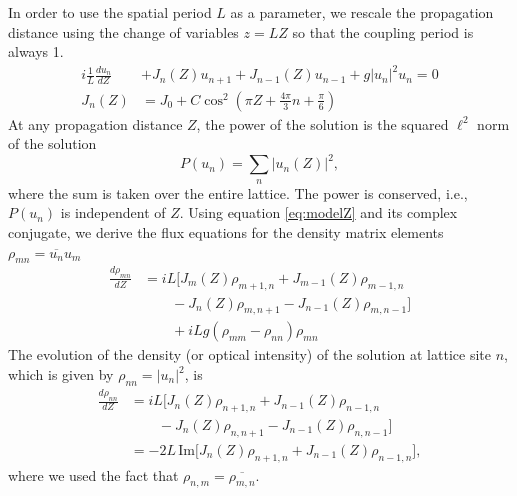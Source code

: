 \documentclass[reprint, amsmath,amssymb,aps,pre]{revtex4-2}
\begin{document}
In order to use the spatial period $L$ as a parameter, we rescale the propagation distance using the change of variables $z = L Z$ so that the coupling period is always 1.
\begin{equation}\label{eq:modelZ}
\begin{aligned}
i \frac{1}{L} \frac{d u_n}{d Z} &+ J_n(Z) u_{n+1} + J_{n-1}(Z)u_{n-1} + g|u_n|^2 u_n = 0 \\
J_n(Z) &= J_0 + C \cos^2\left( \pi Z + \frac{4 \pi}{3} n + \frac{\pi}{6} \right)
\end{aligned}
\end{equation}
At any propagation distance $Z$, the power of the solution is the squared $\ell^2$ norm of the solution
\begin{equation}
P(u_n) = \sum_{n} | u_n(Z) |^2,
\end{equation} 
where the sum is taken over the entire lattice. The power is conserved, i.e., $P(u_n)$ is independent of $Z$. Using equation \cref{eq:modelZ} and its complex conjugate, we derive the flux equations
for the density matrix elements $\rho_{mn} = \overline{u_n} u_m$
\begin{equation}\label{eq:rhoeq}
\begin{aligned}
\frac{d \rho_{mn}}{dZ} &= iL \Big[ J_m(Z) \rho_{m+1,n} + J_{m-1}(Z) \rho_{m-1,n} \\
&\qquad -J_n(Z) \rho_{m,n+1} - J_{n-1}(Z) \rho_{m,n-1} \big] \\
&\qquad + iLg\left( \rho_{mm} - \rho_{nn} \right) \rho_{mn}
\end{aligned}
\end{equation}
The evolution of the density (or optical intensity) of the solution at lattice site $n$, which is given by $\rho_{nn} = | u_n |^2$, is
\begin{equation}\label{eq:powerevol}
\begin{aligned}
\frac{d\rho_{nn} }{dZ} &= iL \Big[ J_n(Z) \rho_{n+1,n} + J_{n-1}(Z) \rho_{n-1,n} \\
&\qquad -J_n(Z) \rho_{n,n+1} - J_{n-1}(Z) \rho_{n,n-1} \big] \\
&= -2L\,\text{Im}\Big[ J_n(Z) \rho_{n+1,n} + J_{n-1}(Z) \rho_{n-1,n} \Big],
\end{aligned}
\end{equation}
where we used the fact that $\rho_{n,m} = \overline{\rho_{m,n}}$.
\end{document}
